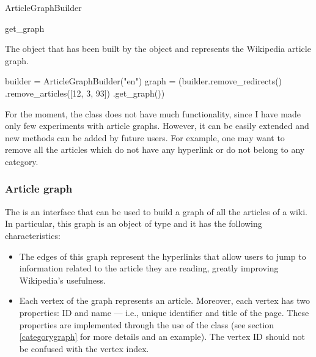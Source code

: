 \begin{classdoc}{ArticleGraphBuilder}
\begin{classmethod}{get\_graph}{}
                    \emptyfunctionparameters{}
                    
                    \begin{functionoutput}
                        The  object that has been built by the  object and represents the Wikipedia article graph.
                    \end{functionoutput}
                    
                    \begin{functionexample}
builder = ArticleGraphBuilder("en")
graph = (builder.remove_redirects()
                .remove_articles([12, 3, 93])
                .get_graph())
                    \end{functionexample}
                \end{classmethod}
            \end{classdoc}
            For the moment, the  class does not have much functionality, since I have made only few experiments with article graphs. However, it can be easily extended and new methods can be added by future users. For example, one may want to remove all the articles which do not have any hyperlink or do not belong to any category.
            \subsubsection{Article graph}
                The  is an interface that can be used to build a graph of all the articles of a wiki. In particular, this graph is an object of type  and it has the following characteristics:
                \begin{itemize}
                    \item The edges of this graph represent the hyperlinks that allow users to jump to information related to the article they are reading, greatly improving Wikipedia's usefulness.
                    \item Each vertex of the graph represents an article. Moreover, each vertex has two properties: ID and name --- i.e., unique identifier and title of the page. These properties are implemented through the use of the  class (see section \ref{categorygraph} for more details and an example). The vertex ID should not be confused with the vertex index.
                \end{itemize}
